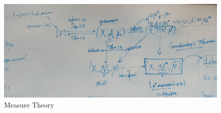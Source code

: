 	\newpage
	
	\begin{figure}[thbp!]
		\centering
		\includegraphics[width=1.0\linewidth]{figure/1.5}
		\caption{Measure Theory}
		\label{pic : 4.7.2-1} %
	\end{figure}

	\ifx\allfiles\undefined

\fi